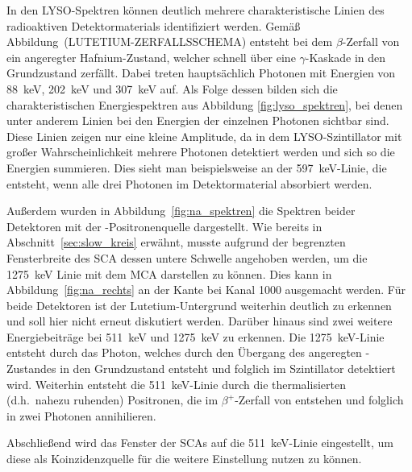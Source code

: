 \documentclass[11pt, a4paper]{article}
\numberwithin{equation}{section}
\newcommand{\korr}[1]{{\color{red}(#1)}}
\begin{document}
In den LYSO-Spektren können deutlich mehrere charakteristische Linien des radioaktiven Detektormaterials identifiziert werden.
Gemäß Abbildung~\korr{LUTETIUM-ZERFALLSSCHEMA} entsteht bei dem $\beta$-Zerfall von  ein angeregter Hafnium-Zustand, welcher schnell über eine $\gamma$-Kaskade in den Grundzustand zerfällt.
Dabei treten hauptsächlich Photonen mit Energien von \SI{88}{\keV}, \SI{202}{\keV} und \SI{307}{\keV} auf.
Als Folge dessen bilden sich die charakteristischen Energiespektren aus Abbildung \ref{fig:lyso_spektren}, bei denen unter anderem Linien bei den Energien der einzelnen Photonen sichtbar sind.
Diese Linien zeigen nur eine kleine Amplitude, da in dem LYSO-Szintillator mit großer Wahrscheinlichkeit mehrere Photonen detektiert werden und sich so die Energien summieren.
Dies sieht man beispielsweise an der \SI{597}{\keV}-Linie, die entsteht, wenn alle drei Photonen im Detektormaterial absorbiert werden.

Außerdem wurden in Abbildung~\ref{fig:na_spektren} die Spektren beider Detektoren mit der -Positronenquelle dargestellt.
Wie bereits in Abschnitt~\ref{sec:slow_kreis} erwähnt, musste aufgrund der begrenzten Fensterbreite des SCA dessen untere Schwelle angehoben werden, um die \SI{1275}{\keV} Linie mit dem MCA darstellen zu können.
Dies kann in Abbildung~\ref{fig:na_rechts} an der Kante bei Kanal 1000 ausgemacht werden.
Für beide Detektoren ist der Lutetium-Untergrund weiterhin deutlich zu erkennen und soll hier nicht erneut diskutiert werden.
Darüber hinaus sind zwei weitere Energiebeiträge bei \SI{511}{\keV} und \SI{1275}{\keV} zu erkennen.
Die \SI{1275}{\keV}-Linie entsteht durch das Photon, welches durch den Übergang des angeregten -Zustandes in den Grundzustand entsteht und folglich im Szintillator detektiert wird.
Weiterhin entsteht die \SI{511}{\keV}-Linie durch die thermalisierten (d.h.\ nahezu ruhenden) Positronen, die im $\beta^+$-Zerfall von  entstehen und folglich in zwei Photonen annihilieren.

Abschließend wird das Fenster der SCAs auf die \SI{511}{keV}-Linie eingestellt, um diese als Koinzidenzquelle für die weitere Einstellung nutzen zu können.
\end{document}
